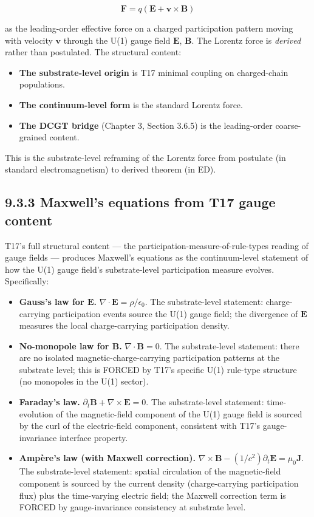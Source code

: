 \documentclass[11pt]{book}
\begin{document}
\[
\mathbf{F} = q(\mathbf{E} + \mathbf{v}\times\mathbf{B})
\]

as the leading-order effective force on a charged participation pattern moving with velocity $\mathbf{v}$ through the U(1) gauge field $\mathbf{E}$, $\mathbf{B}$. The Lorentz force is \textit{derived} rather than postulated. The structural content:

\begin{itemize}
\item \textbf{The substrate-level origin} is T17 minimal coupling on charged-chain populations.
\item \textbf{The continuum-level form} is the standard Lorentz force.
\item \textbf{The DCGT bridge} (Chapter 3, Section 3.6.5) is the leading-order coarse-grained content.
\end{itemize}

This is the substrate-level reframing of the Lorentz force from postulate (in standard electromagnetism) to derived theorem (in ED).

\subsection{9.3.3 Maxwell's equations from T17 gauge content}

T17's full structural content — the participation-measure-of-rule-types reading of gauge fields — produces Maxwell's equations as the continuum-level statement of how the U(1) gauge field's substrate-level participation measure evolves. Specifically:

\begin{itemize}
\item \textbf{Gauss's law for $\mathbf{E}$.} $\nabla\cdot\mathbf{E} = \rho/\epsilon_0$. The substrate-level statement: charge-carrying participation events source the U(1) gauge field; the divergence of $\mathbf{E}$ measures the local charge-carrying participation density.
\item \textbf{No-monopole law for $\mathbf{B}$.} $\nabla\cdot\mathbf{B} = 0$. The substrate-level statement: there are no isolated magnetic-charge-carrying participation patterns at the substrate level; this is FORCED by T17's specific U(1) rule-type structure (no monopoles in the U(1) sector).
\item \textbf{Faraday's law.} $\partial_t\mathbf{B} + \nabla\times\mathbf{E} = 0$. The substrate-level statement: time-evolution of the magnetic-field component of the U(1) gauge field is sourced by the curl of the electric-field component, consistent with T17's gauge-invariance interface property.
\item \textbf{Ampère's law (with Maxwell correction).} $\nabla\times\mathbf{B} - (1/c^2)\partial_t\mathbf{E} = \mu_0\mathbf{J}$. The substrate-level statement: spatial circulation of the magnetic-field component is sourced by the current density (charge-carrying participation flux) plus the time-varying electric field; the Maxwell correction term is FORCED by gauge-invariance consistency at substrate level.
\end{itemize}
\end{document}
